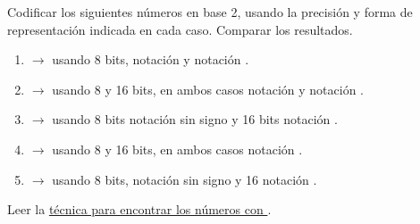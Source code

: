 \begin{enunciado}{\ejercicio}
  Codificar los siguientes números en base 2, usando la precisión y forma de representación
  indicada en cada caso. Comparar los resultados.

  \begin{enumerate}[label=\tiny $\blacksquare_{\tt\alph*}$]
    \item {} $\to$ usando 8 bits, notación \sigMag y notación \compDos.
    \item {} $\to$ usando 8 y 16 bits, en ambos casos notación \sigMag y notación \compDos.
    \item {} $\to$ usando 8 bits notación sin signo y 16 bits notación \compDos.
    \item {} $\to$ usando 8 y 16 bits, en ambos casos notación \compDos.
    \item {} $\to$ usando 8 bits, notación sin signo y 16 notación \compDos.
  \end{enumerate}
\end{enunciado}
Leer la \hyperlink{teoria-1:complementoA2}{técnica para encontrar los números con \compDos}.
